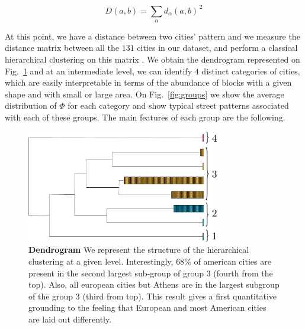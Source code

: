 \begin{equation} 
    D(a,b)= \sum_\alpha d_\alpha(a,b)^{\,2} 
\end{equation} 

At this
point, we have a distance between two cities' pattern and we measure the
distance matrix between all the $131$ cities in our dataset, and perform a
classical hierarchical clustering on this matrix \cite{Clustering}. We
obtain the dendrogram represented on Fig.~\ref{fig:dendrogram} and at an
intermediate level, we can identify $4$ distinct categories of cities, which
are easily interpretable in terms of the abundance of blocks with a given
shape and with small or large area. On Fig.~\ref{fig:groups} we show the
average distribution of $\Phi$ for each category and show typical street
patterns associated with each of these groups. The main features of each
group are the following.  

\begin{figure}
    \includegraphics[width=0.75\textwidth]{./gfx/chapter-networks/dendrogram.pdf}
    \caption{{\bf Dendrogram} We represent the structure of the hierarchical
    clustering at a given level. Interestingly, $68\%$ of american cities are
    present in the second largest sub-group of group $3$ (fourth from the top).
    Also, all european cities but Athens are in the largest subgroup of the group
    $3$ (third from top). This result gives a first quantitative grounding to the
    feeling that European and most American cities are laid out
    differently.\label{fig:dendrogram}} 
\end{figure}

